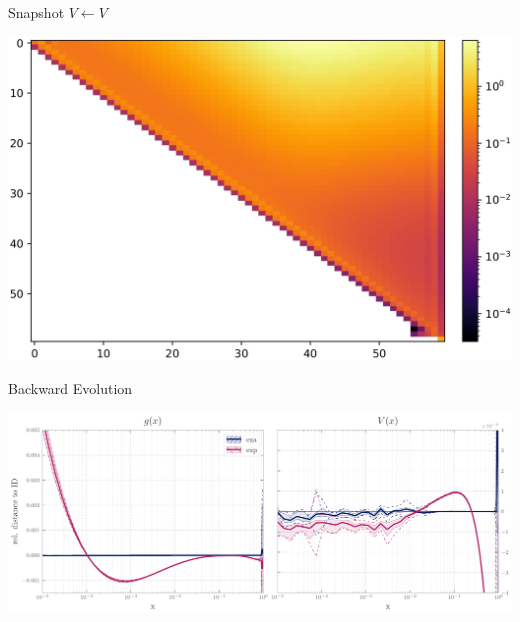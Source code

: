 \documentclass[9pt]{beamer}
\begin{document}
\begin{frame}{\eko{} Snapshot $V\leftarrow V$}
	\begin{center}
		\includegraphics[width=\linewidth]{VvV.png}
	\end{center}
\end{frame}
\begin{frame}{\eko{} Backward Evolution}
	\begin{center}
		\includegraphics[width=\linewidth]{closure_test.pdf}
	\end{center}
\end{frame}
\end{document}
